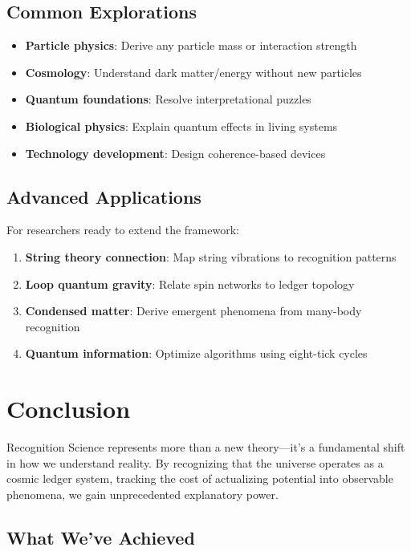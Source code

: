 \documentclass[12pt,a4paper]{article}
\theoremstyle{definition}
\begin{document}
\subsection{Common Explorations}

\begin{itemize}
    \item \textbf{Particle physics}: Derive any particle mass or interaction strength
    \item \textbf{Cosmology}: Understand dark matter/energy without new particles
    \item \textbf{Quantum foundations}: Resolve interpretational puzzles
    \item \textbf{Biological physics}: Explain quantum effects in living systems
    \item \textbf{Technology development}: Design coherence-based devices
\end{itemize}

\subsection{Advanced Applications}

For researchers ready to extend the framework:

\begin{enumerate}
    \item \textbf{String theory connection}: Map string vibrations to recognition patterns
    \item \textbf{Loop quantum gravity}: Relate spin networks to ledger topology
    \item \textbf{Condensed matter}: Derive emergent phenomena from many-body recognition
    \item \textbf{Quantum information}: Optimize algorithms using eight-tick cycles
\end{enumerate}

\section{Conclusion}

Recognition Science represents more than a new theory—it's a fundamental shift in how we understand reality. By recognizing that the universe operates as a cosmic ledger system, tracking the cost of actualizing potential into observable phenomena, we gain unprecedented explanatory power.

\subsection{What We've Achieved}
\end{document}
